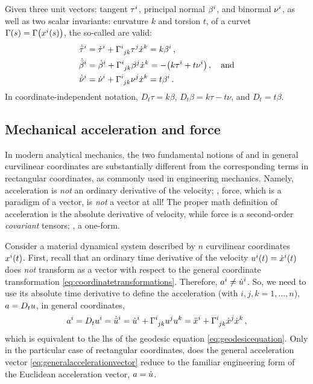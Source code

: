 \begin{example}
  Given three unit vectors: tangent $\tvec\tau i$, principal normal $\tvec\beta i$, and binormal $\tvec\nu i$, as well as two scalar invariants: curvature $k$ and torsion $t$, of a curvet $\Gamma\vat s = \Gamma\vat{\tvec\pos i\vat s}$, the so-called  are valid:
  \begin{align*}
    \tvec{\dbder\tau}{i}  &= \tvec{\dt\tau}{i}  + \skchris ijk\tvec\tau j\tvec{\dt\pos}{k} = k\tvec\beta i \,,\\
    \tvec{\dbder\beta}{i} &= \tvec{\dt\beta}{i} + \skchris ijk\tvec\beta j\tvec{\dt\pos}{k} = -\parens{k\tvec\tau i + t\tvec\nu i} \,,
      \quad\text{and}\\
    \tvec{\dbder\nu}{i} &= \tvec{\dt\nu}{i} + \skchris ijk\tvec\nu j\tvec{\dt\pos}{k} = t\tvec\beta i \,.
  \end{align*}
  In coordinate-independent notation, $D_t\tau = k\beta$, $D_t\beta = k\tau - t\nu$, and $D_t = t\beta$.
\end{example}


\subsection{Mechanical acceleration and force}
%
In modern analytical mechanics, the two fundamental notions of  and  in general curvilinear coordinates are substantially different from the corresponding terms in rectangular coordinates, as commonly used in engineering mechanics. Namely, acceleration is \emph{not} an ordinary derivative of the velocity; , force, which is a paradigm of a vector, is \emph{not} a vector at all! The proper math definition of acceleration is the absolute derivative of velocity, while force is a second-order \emph{covariant} tensors; \ie, a one-form.

Consider a material dynamical system described by $n$ curvilinear coordinates $\tvec\pos i\vat t$. First, recall that an ordinary time derivative of the velocity $\tvec\vel i\vat t = \tvec{\dt\pos}i\vat t$ does \emph{not} transform as a vector with respect to the general coordinate transformation \cref{eq:coordinatetransformations}. Therefore, $\tvec\acc i \neq \tvec{\dt\vel}i$. So, we need to use its absolute time derivative to define the acceleration (with $i,j,k = 1,\dotsc,n$), $a = D_tu$, in general coordinates,
%
\begin{equation}\label{eq:generalaccelerationvector}
  \tvec\acc i = D_t\tvec\vel i
              = \tvec{\dbder\vel}{i}
              = \tvec{\dt\vel}{i} + \skchris ijk\tvec\vel j\tvec\vel k
              = \tvec{\ddt\pos}{i} + \skchris ijk\tvec{\dt\pos}{j}\tvec{\dt\pos}{k}\,,
\end{equation}
%
which is equivalent to the lhs of the geodesic equation \cref{eq:geodesicequation}. Only in the particular case of rectangular coordinates, does the general acceleration vector \cref{eq:generalaccelerationvector} reduce to the familiar engineering form of the Euclidean acceleration vector, $a = \dot{u}$.

